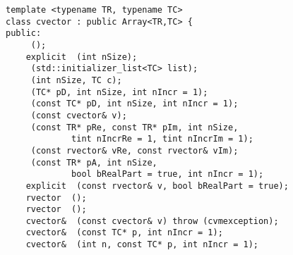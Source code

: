 \bigskip
\noindent
\verb"template <typename TR, typename TC>"\\
\verb"class cvector : public Array<TR,TC> {"\\
\verb"public:"\\
\verb"    "\verb" ();"\\
\verb"    explicit "\verb" (int nSize);"\\
\verb"    "\verb" (std::initializer_list<TC> list);"\\
\verb"    "\verb" (int nSize, TC c);"\\
\verb"    "\verb" (TC* pD, int nSize, int nIncr = 1);"\\
\verb"    "\verb" (const TC* pD, int nSize, int nIncr = 1);"\\
\verb"    "\verb" (const cvector& v);"\\
\verb"    "\verb" (const TR* pRe, const TR* pIm, int nSize,"\\
\verb"             tint nIncrRe = 1, tint nIncrIm = 1);"\\
\verb"    "\verb" (const rvector& vRe, const rvector& vIm);"\\
\verb"    "\verb" (const TR* pA, int nSize,"\\
\verb"             bool bRealPart = true, int nIncr = 1);"\\
\verb"    explicit "\verb" (const rvector& v, bool bRealPart = true);"\\
\verb"    rvector "\verb" ();"\\
\verb"    rvector "\verb" ();"\\
\verb"    cvector& "\verb" (const cvector& v) throw (cvmexception);"\\
\verb"    cvector& "\verb" (const TC* p, int nIncr = 1);"\\
\verb"    cvector& "\verb" (int n, const TC* p, int nIncr = 1);"\\
